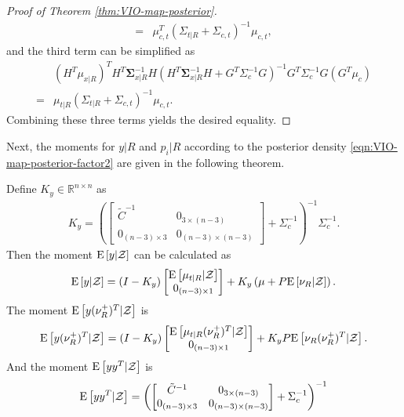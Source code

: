 \begin{proof}[Proof of Theorem \ref{thm:VIO-map-posterior}]
\begin{align*}
		= &\mu_{c,t}^T (\Sigma_{t|R}+\Sigma_{c,t})^{-1} \mu_{c,t},
	\end{align*}
	and the third term can be simplified as
	\begin{align*}
		&(H^T\mu_{x|R})^T H^T\bm{\Sigma}_{x|R}^{-1} H \left( H^T\bm{\Sigma}_{x|R}^{-1}H + G^T\Sigma_c^{-1}G \right)^{-1} G^T\Sigma_c^{-1}G (G^T\mu_c) \\
		= &\mu_{t|R} (\Sigma_{t|R}+\Sigma_{c,t})^{-1} \mu_{c,t}.
	\end{align*}
	Combining these three terms yields the desired equality.
\end{proof}

Next, the moments for $y|R$ and $p_i|R$ according to the posterior density \eqref{eqn:VIO-map-posterior-factor2} are given in the following theorem.

\begin{theorem} \label{thm:VIO-map-posterior-moments}
	Define $K_y \in \mathbb{R}^{n\times n}$ as
	\begin{align}
		K_y = \left( \begin{bmatrix} \tilde{C}^{-1} & 0_{3\times (n-3)} \\ 0_{(n-3)\times 3} & 0_{(n-3)\times (n-3)} \end{bmatrix} + \Sigma_c^{-1} \right)^{-1} \Sigma_c^{-1}.
	\end{align}
	Then the moment $\mathrm{E}\left[ y|\mathcal{Z} \right]$ can be calculated as
	\begin{align}
		\mathrm{E}\left[ y|\mathcal{Z} \right] = (I-K_y) \begin{bmatrix} \mathrm{E}\left[ \mu_{t|R}|\mathcal{Z} \right] \\ 0_{(n-3)\times 1} \end{bmatrix} + K_y\left( \mu + P\mathrm{E}\left[ \nu_R|\mathcal{Z} \right] \right).
	\end{align}
	The moment $\mathrm{E}\left[ y(\nu_R^+)^T|\mathcal{Z} \right]$ is
	\begin{align}
		\mathrm{E}\left[ y(\nu_R^+)^T|\mathcal{Z} \right] = (I-K_y) \begin{bmatrix} \mathrm{E}\left[ \mu_{t|R}(\nu_R^+)^T|\mathcal{Z} \right] \\ 0_{(n-3)\times 1} \end{bmatrix} + K_yP\mathrm{E}\left[ \nu_R(\nu_R^+)^T|\mathcal{Z} \right].
	\end{align}
	And the moment $\mathrm{E}\left[ yy^T|\mathcal{Z} \right]$ is
	\begin{align} \label{eqn:VIO-map-posterior-Eyy}
		&\expect{yy^T|\mathcal{Z}} = \left( \begin{bmatrix} \tilde{C}^{-1} & 0_{3\times (n-3)} \\ 0_{(n-3)\times 3} & 0_{(n-3)\times (n-3)} \end{bmatrix} + \Sigma_c^{-1} \right)^{-1} \nonumber \\

\end{align}
\end{theorem}
